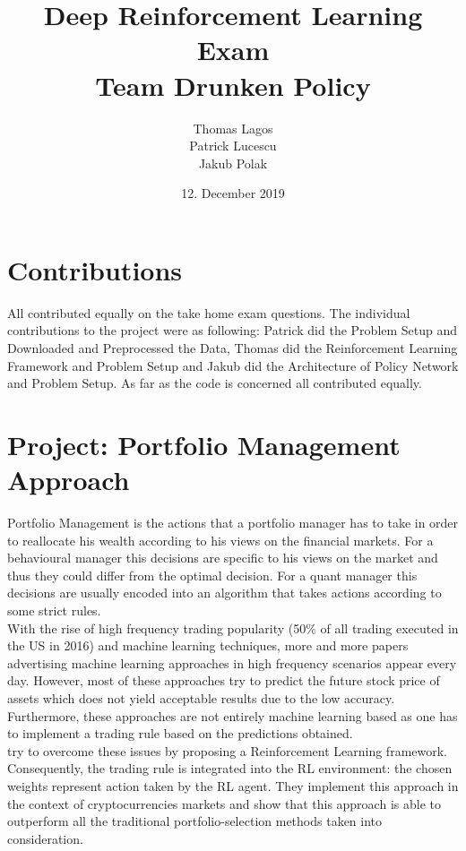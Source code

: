 \documentclass{article}
\title{Deep Reinforcement Learning Exam\\ Team Drunken Policy}
\author{Thomas Lagos \\ Patrick Lucescu \\ Jakub Polak}
\date{12. December 2019}
\begin{document}
\maketitle

\tableofcontents
\begingroup
\let\clearpage\relax
\section*{Contributions}
All contributed equally on the take home exam questions. The individual contributions to the project were as following: Patrick did the Problem Setup and Downloaded and Preprocessed the Data, Thomas did the Reinforcement Learning Framework and Problem Setup and Jakub did the Architecture of Policy Network and Problem Setup. As far as the code is concerned all contributed equally.
\endgroup
\newpage
\section{Project: Portfolio Management Approach}

Portfolio Management is the actions that a portfolio manager has to take in order to reallocate his wealth according to his views on the financial markets. For a behavioural manager this decisions are specific to his views on the market and thus they could differ from the optimal decision. For a quant manager this decisions are usually encoded into an algorithm that takes actions according to some strict rules. \\

With the rise of high frequency trading popularity (50\% of all trading executed in the US in 2016) and machine learning techniques, more and more papers advertising machine learning approaches in high frequency scenarios appear every day. However, most of these approaches try to predict the future stock price of assets which does not yield acceptable results due to the low accuracy. Furthermore, these approaches are not entirely machine learning based as one has to implement a trading rule based on the predictions obtained.\\

\cite{jiang2017deep} try to overcome these issues by proposing a Reinforcement Learning framework. Consequently, the trading rule is integrated into the RL environment: the chosen weights represent action taken by the RL agent. They implement this approach in the context of cryptocurrencies markets and show that this approach is able to outperform all the traditional portfolio-selection methods taken into consideration. \\
\end{document}
